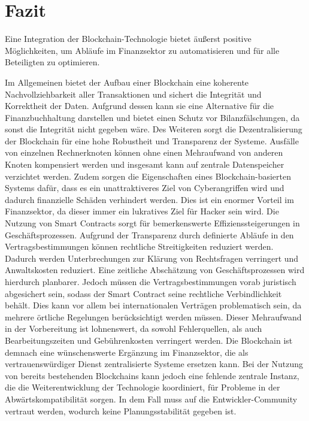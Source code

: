 \section{Fazit}

Eine Integration der Blockchain-Technologie bietet äußerst positive Möglichkeiten, um
Abläufe im Finanzsektor zu automatisieren und für alle Beteiligten zu optimieren.

Im Allgemeinen bietet der Aufbau einer Blockchain eine koherente Nachvollziehbarkeit aller 
Transaktionen und sichert die Integrität und Korrektheit der Daten. 
Aufgrund dessen kann sie eine Alternative für die Finanzbuchhaltung darstellen und bietet 
einen Schutz vor Bilanzfälschungen, da sonst die Integrität nicht gegeben wäre.
Des Weiteren sorgt die Dezentralisierung der Blockchain für eine hohe Robustheit und 
Transparenz der Systeme.
Ausfälle von einzelnen Rechnerknoten können ohne einen Mehraufwand von anderen Knoten
kompensiert werden und insgesamt kann auf zentrale Datenspeicher verzichtet werden.
\cite[p.~70]{fill2020blockchain}
Zudem sorgen die Eigenschaften eines Blockchain-basierten Systems dafür, dass es ein
unattraktiveres Ziel von Cyberangriffen wird und dadurch finanzielle Schäden verhindert
werden. Dies ist ein enormer Vorteil im Finanzsektor, da dieser immer ein lukratives Ziel 
für Hacker sein wird.
\newline
Die Nutzung von Smart Contracts sorgt für bemerkenswerte Effizienssteigerungen in
Geschäftsprozessen. 
Aufgrund der Transparenz durch definierte Abläufe in den Vertragsbestimmungen können 
rechtliche Streitigkeiten reduziert werden. Dadurch werden Unterbrechungen zur Klärung von
Rechtsfragen verringert und Anwaltskosten reduziert. Eine zeitliche Abschätzung von 
Geschäftsprozessen wird hierdurch planbarer.
Jedoch müssen die Vertragsbestimmungen vorab juristisch abgesichert sein, sodass der Smart 
Contract seine rechtliche Verbindlichkeit behält. Dies kann vor allem bei internationalen
Verträgen problematisch sein, da mehrere örtliche Regelungen berücksichtigt werden müssen.
Dieser Mehraufwand in der Vorbereitung ist lohnenswert, da sowohl Fehlerquellen, 
als auch Bearbeitungszeiten und Gebührenkosten verringert werden.
\newline
Die Blockchain ist demnach eine wünschenswerte Ergänzung im Finanzsektor, die als 
vertrauenswürdiger Dienst zentralisierte Systeme ersetzen kann.
Bei der Nutzung von bereits bestehenden Blockchains kann jedoch eine fehlende zentrale 
Instanz, die die Weiterentwicklung der Technologie koordiniert, für Probleme in der 
Abwärtskompatibilität sorgen. In dem Fall muss auf die Entwickler-Community vertraut werden,
wodurch keine Planungsstabilität gegeben ist.
\cite[p.~70f]{fill2020blockchain}










